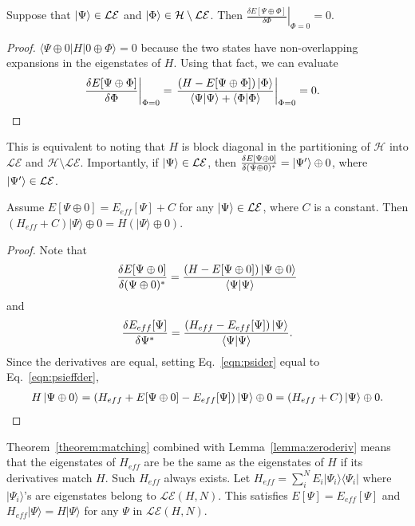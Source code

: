 \begin{lemma}
\label{lemma:zeroderiv}
Suppose that $\ket{\Psi}\in \mathcal{LE}$ and $\ket{\Phi} \in {\mathcal H} \setminus \mathcal{LE}$. 
Then $\left.\frac{\delta E[\Psi \oplus \Phi]}{\delta \Phi}\right|_{\Phi=0}=0$. 
\end{lemma}
\begin{proof}
$\langle \Psi\oplus 0 | H | 0\oplus \Phi \rangle=0$ because the two states have non-overlapping expansions in the eigenstates of $H$. 
Using that fact, we can evaluate
\begin{align}
\left.\frac{\delta E[\Psi \oplus \Phi]}{\delta \Phi}\right|_{\Phi=0} &= \left.\frac{\left(H-E[\Psi\oplus\Phi]\right) \ket{\Phi} }{\braket{\Psi|\Psi} + \braket{\Phi|\Phi}} \right|_{\Phi=0} = 0.
\end{align}
\end{proof}
This is equivalent to noting that $H$ is block diagonal in the partitioning of ${\mathcal H}$ into $\mathcal{LE}$ and ${\mathcal H} \setminus \mathcal{LE}$.
Importantly, if $\ket{\Psi} \in \mathcal{LE}$, then $\frac{\delta  E[\Psi\oplus 0] }{\delta (\Psi\oplus 0)^*} = \ket{\Psi'} \oplus 0$, where $\ket{\Psi'} \in \mathcal{LE} $. 

\begin{theorem}
\label{theorem:matching}
Assume $ E[\Psi\oplus 0]  = E_{eff}[\Psi]+C$ for any $\ket{\Psi } \in \mathcal{LE}$, where $C$ is a constant. 
Then $(H_{eff}+C)|\Psi\rangle\oplus 0 = H (|\Psi\rangle \oplus 0)$.
\end{theorem}
\begin{proof}
Note that
\begin{align}
	\frac{\delta E[\Psi\oplus 0]}{\delta (\Psi\oplus 0)^*}=\frac{(H-E[\Psi\oplus 0])\ket{\Psi\oplus 0} }{\braket{\Psi|\Psi}}
	\label{eqn:psider}
\end{align}
and 
\begin{align}
	\frac{\delta E_{eff}[\Psi]}{\delta \Psi^*}=\frac{(H_{eff}-E_{eff}[\Psi])\ket{\Psi} }{\braket{\Psi|\Psi}}.
	\label{eqn:psieffder}
\end{align}
Since the derivatives are equal, setting Eq.~\eqref{eqn:psider} equal to Eq.~\eqref{eqn:psieffder},
\begin{align}
	 H\ket{\Psi\oplus 0}= (H_{eff}+E[\Psi\oplus 0]-E_{eff}[\Psi])\ket{\Psi}\oplus 0 =(H_{eff}+C)\ket{\Psi}\oplus 0.
\end{align}
\end{proof}


Theorem~\ref{theorem:matching} combined with Lemma~\ref{lemma:zeroderiv} means that the eigenstates of $H_{eff}$ are be the same as the eigenstates of $H$ if its derivatives match $H$. 
Such $H_{eff}$ always exists. 
Let $H_{eff} = \sum_{i}^N E_i |\Psi_i\rangle \langle \Psi_i|$ where $|\Psi_i\rangle$'s are eigenstates belong to $\mathcal{LE}(H,N)$. This satisfies $E[\Psi] = E_{eff}[\Psi]$ and $H_{eff}|\Psi\rangle = H |\Psi \rangle$ for any $\Psi$ in $\mathcal{LE}(H,N)$.  

